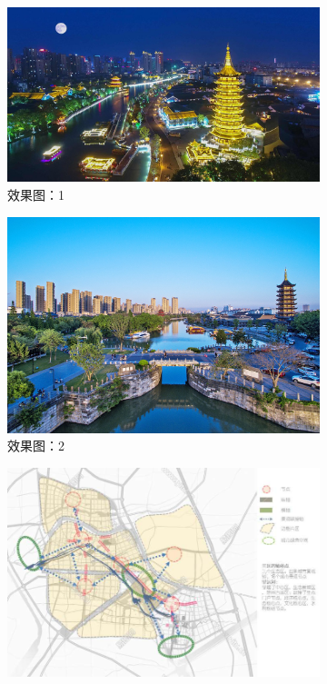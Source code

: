 \documentclass[H:\workspace\担保人财务信息2\杭州大运河\HangZhouText.tex]{subfiles}
\begin{document}
\begin{figure}[H]
    \centering 
    \begin{subfigure}[t]{0.4\textwidth}
        \includegraphics[width=\textwidth]{img8.png}
        \caption{效果图：1}
        \label{fig:1}
    \end{subfigure}
    \hfill 
    \begin{subfigure}[t]{0.4\textwidth}
        \includegraphics[width=\textwidth]{img9.png}
        \caption{效果图：2}
        \label{fig:2}
    \end{subfigure}
    \hfill 
    \begin{subfigure}[b]{0.4\textwidth}
        \includegraphics[width=\textwidth]{img10.png}

\end{subfigure}
\end{figure}
\end{document}

